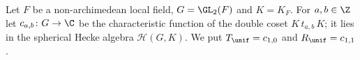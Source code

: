 Let $F$ be a non-archimedean local field, $G=\GL_2(F)$ and $K=K_F$. For $a,b\in\Z$ let
$c_{a,b}\colon G\to\C$ be the characteristic function of the double coset $K\,t_{a,b}\,K$; it lies in the spherical
Hecke algebra $\mathcal H(G,K)$. We put $T_\unif=c_{1,0}$ and $R_\unif=c_{1,1}$.
